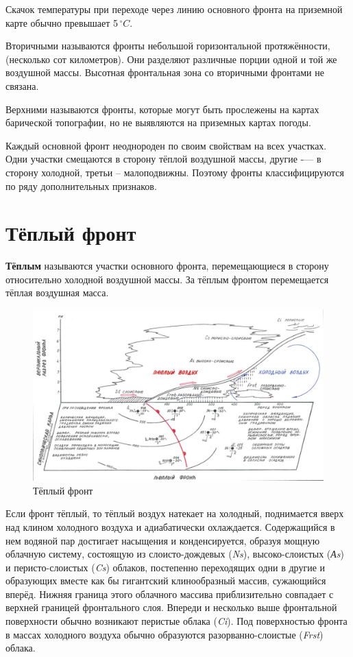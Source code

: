 \documentclass[a4paper, 12pt, twoside, final, book, russian, fittopage, cyremdash, openright]{ncc}
\newcommand{\grC}{\ensuremath{\,^\circ{}C}\xspace}
\begin{document}
Скачок температуры при переходе через линию основного фронта на
приземной карте обычно превышает 5\grC.

Вторичными называются фронты небольшой горизонтальной протяжённости,
(несколько сот километров).  Они разделяют различные порции одной и
той же воздушной массы. Высотная фронтальная зона со вторичными
фронтами не связана.

Верхними называются фронты, которые могут быть прослежены на картах
барической топографии, но не выявляются на приземных картах погоды.

Каждый основной фронт неоднороден по своим свойствам на всех
участках. Одни участки смещаются в сторону тёплой воздушной массы,
другие \--— в сторону холодной, третьи \--- малоподвижны. Поэтому фронты
классифицируются по ряду дополнительных признаков.

\section{Тёплый фронт}
\label{sec:warm_front}

\textbf{Тёплым} называются участки основного фронта, перемещающиеся в сторону
относительно холодной воздушной массы. За тёплым фронтом перемещается
тёплая воздушная масса.

\begin{figure}[htb]
   \centering
   \includegraphics[scale=0.7]{06_warm_front.pdf}
   \caption{Тёплый фронт}
   \label{fig:06_warm_front}
\end{figure}

Если фронт тёплый, то тёплый воздух натекает на холодный, поднимается
вверх над клином холодного воздуха и адиабатически
охлаждается. Содержащийся в нем водяной пар достигает насыщения и
конденсируется, образуя мощную облачную систему, состоящую из
слоисто-дождевых (\textit{Ns}), высоко-слоистых (\textit{Аs}) и
перисто-слоистых (\textit{Cs}) облаков, постепенно переходящих одни в
другие и образующих вместе как бы гигантский клинообразный массив,
сужающийся вперёд. Нижняя граница этого облачного массива
приблизительно совпадает с верхней границей фронтального слоя. Впереди
и несколько выше фронтальной поверхности обычно возникают перистые
облака (\textit{Ci}). Под поверхностью фронта в массах холодного
воздуха обычно образуются разорванно-слоистые (\textit{Frst}) облака.
\end{document}
